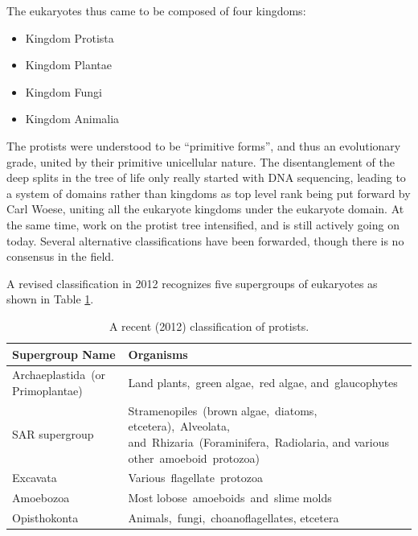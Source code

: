 The eukaryotes thus came to be composed of four kingdoms:

\begin{itemize}
\tightlist
\item
  Kingdom Protista
\item
  Kingdom Plantae
\item
  Kingdom Fungi
\item
  Kingdom Animalia
\end{itemize}

The protists were understood to be ``primitive forms'', and thus an evolutionary grade, united by their primitive unicellular nature. The disentanglement of the deep splits in the tree of life only really started with DNA sequencing, leading to a system of domains rather than kingdoms as top level rank being put forward by Carl Woese, uniting all the eukaryote kingdoms under the eukaryote domain. At the same time, work on the protist tree intensified, and is still actively going on today. Several alternative classifications have been forwarded, though there is no consensus in the field.

A revised classification in 2012 recognizes five supergroups of eukaryotes as shown in Table \ref{tab:eukaryotetaxonomy}.

\begin{table}[!h]

\caption{\label{tab:eukaryotetaxonomy}A recent (2012) classification of protists.}
\centering
\begin{tabular}[t]{>{\raggedright\arraybackslash}p{8em}>{\raggedright\arraybackslash}p{17em}}
\toprule
Supergroup Name & Organisms\\
\midrule
\rowcolor{gray!6}  Archaeplastida (or Primoplantae) & Land plants, green algae, red algae, and glaucophytes\\
SAR supergroup & Stramenopiles (brown algae, diatoms, etcetera), Alveolata, and Rhizaria (Foraminifera, Radiolaria, and various other amoeboid protozoa)\\
\rowcolor{gray!6}  Excavata & Various flagellate protozoa\\
Amoebozoa & Most lobose amoeboids and slime molds\\
\rowcolor{gray!6}  Opisthokonta & Animals, fungi, choanoflagellates, etcetera\\
\bottomrule
\end{tabular}
\end{table}

